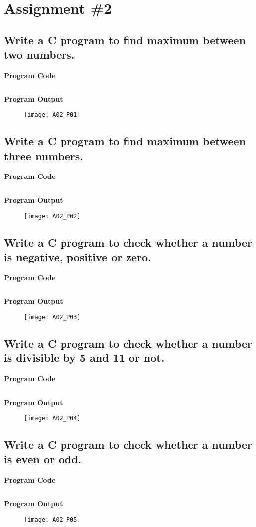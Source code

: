 \section{Assignment \#2}

\subsection{Write a C program to find maximum between two numbers.}
\textbf{Program Code}
\inputminted[breaklines]{C}{programs/A02_P01.c}
\textbf{Program Output}
\begin{figure}[h]
  \texttt{[image: A02\_P01]}
\end{figure}
\pagebreak

\subsection{Write a C program to find maximum between three numbers.}
\textbf{Program Code}
\inputminted[breaklines]{C}{programs/A02_P02.c}
\textbf{Program Output}
\begin{figure}[h]
  \texttt{[image: A02\_P02]}
\end{figure}
\pagebreak

\subsection{Write a C program to check whether a number is negative, positive or zero.}
\textbf{Program Code}
\inputminted[breaklines]{C}{programs/A02_P03.c}
\textbf{Program Output}
\begin{figure}[h]
  \texttt{[image: A02\_P03]}
\end{figure}
\pagebreak

\subsection{Write a C program to check whether a number is divisible by 5 and 11 or not.}
\textbf{Program Code}
\inputminted[breaklines]{C}{programs/A02_P04.c}
\textbf{Program Output}
\begin{figure}[h]
  \texttt{[image: A02\_P04]}
\end{figure}
\pagebreak

\subsection{Write a C program to check whether a number is even or odd.}
\textbf{Program Code}
\inputminted[breaklines]{C}{programs/A02_P05.c}
\textbf{Program Output}
\begin{figure}[h]
  \texttt{[image: A02\_P05]}
\end{figure}
\pagebreak

